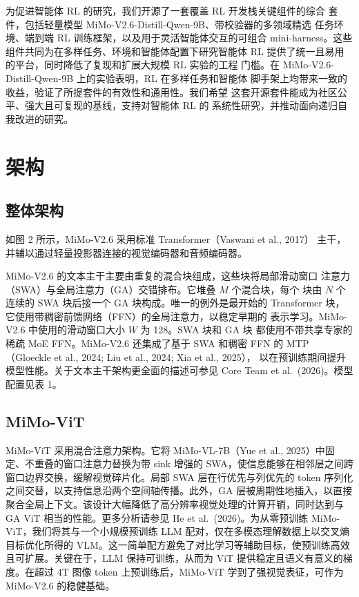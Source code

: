 \documentclass[
  10
]{article}
\begin{document}
为促进智能体 RL 的研究，我们开源了一套覆盖 RL 开发栈关键组件的综合
套件，包括轻量模型 MiMo-V2.6-Distill-Qwen-9B、带校验器的多领域精选
任务环境、端到端 RL 训练框架，以及用于灵活智能体交互的可组合
mini-harness。这些组件共同为在多样任务、环境和智能体配置下研究智能体
RL 提供了统一且易用的平台，同时降低了复现和扩展大规模 RL 实验的工程
门槛。在 MiMo-V2.6-Distill-Qwen-9B 上的实验表明，RL 在多样任务和智能体
脚手架上均带来一致的收益，验证了所提套件的有效性和通用性。我们希望
这套开源套件能成为社区公平、强大且可复现的基线，支持对智能体 RL 的
系统性研究，并推动面向递归自我改进的研究。

\section{架构}\label{architecture}

\subsection{整体架构}\label{overall-architecture}

如图 2 所示，MiMo-V2.6 采用标准 Transformer（Vaswani et al., 2017）
主干，并辅以通过轻量投影器连接的视觉编码器和音频编码器。

MiMo-V2.6 的文本主干主要由重复的混合块组成，这些块将局部滑动窗口
注意力（SWA）与全局注意力（GA）交错排布。它堆叠 $M$ 个混合块，每个
块由 $N$ 个连续的 SWA 块后接一个 GA 块构成。唯一的例外是最开始的
Transformer 块，它使用带稠密前馈网络（FFN）的全局注意力，以稳定早期的
表示学习。MiMo-V2.6 中使用的滑动窗口大小 $W$ 为 128。SWA 块和 GA 块
都使用不带共享专家的稀疏 MoE FFN。MiMo-V2.6 还集成了基于 SWA 和稠密
FFN 的 MTP（Gloeckle et al., 2024; Liu et al., 2024; Xia et al., 2025），
以在预训练期间提升模型性能。关于文本主干架构更全面的描述可参见
Core Team et al.~(2026)。模型配置见表 1。

\subsection{MiMo-ViT}\label{mimo-vit}

MiMo-ViT 采用混合注意力架构。它将 MiMo-VL-7B（Yue et al., 2025）中固定、不重叠的窗口注意力替换为带 sink 增强的 SWA，使信息能够在相邻层之间跨窗口边界交换，缓解视觉碎片化。局部 SWA 层在行优先与列优先的 token 序列化之间交替，以支持信息沿两个空间轴传播。此外，GA 层被周期性地插入，以直接聚合全局上下文。该设计大幅降低了高分辨率视觉处理的计算开销，同时达到与 GA ViT 相当的性能。更多分析请参见 He et al.~(2026)。为从零预训练 MiMo-ViT，我们将其与一个小规模预训练 LLM 配对，仅在多模态理解数据上以交叉熵目标优化所得的 VLM。这一简单配方避免了对比学习等辅助目标，使预训练高效且可扩展。关键在于，LLM 保持可训练，从而为 ViT 提供稳定且语义有意义的梯度。在超过 4T 图像 token 上预训练后，MiMo-ViT 学到了强视觉表征，可作为 MiMo-V2.6 的稳健基础。
\end{document}

